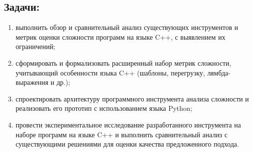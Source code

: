 \documentclass[a4paper,12pt]{article}
\begin{document}
\subsection*{Задачи:}
\begin{enumerate}
    \item выполнить обзор и сравнительный анализ существующих инструментов и метрик оценки сложности программ на языке C++, с выявлением их ограничений;
    \item сформировать и формализовать расширенный набор метрик сложности, учитывающий особенности языка C++ (шаблоны, перегрузку, лямбда-выражения и др.);
    \item спроектировать архитектуру программного инструмента анализа сложности и реализовать его прототип с использованием языка Python;
    \item провести экспериментальное исследование разработанного инструмента на наборе программ на языке C++ и выполнить сравнительный анализ с существующими решениями для оценки качества предложенного подхода.
\end{enumerate}
\end{document}
